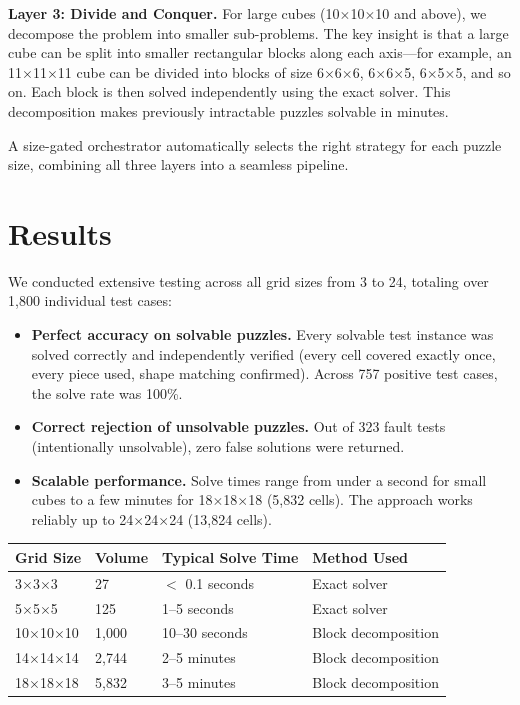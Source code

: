 \documentclass[11pt]{article}
\begin{document}
\textbf{Layer 3: Divide and Conquer.}
For large cubes (10$\times$10$\times$10 and above), we decompose the problem into smaller sub-problems. The key insight is that a large cube can be split into smaller rectangular blocks along each axis---for example, an 11$\times$11$\times$11 cube can be divided into blocks of size 6$\times$6$\times$6, 6$\times$6$\times$5, 6$\times$5$\times$5, and so on. Each block is then solved independently using the exact solver. This decomposition makes previously intractable puzzles solvable in minutes.

A size-gated orchestrator automatically selects the right strategy for each puzzle size, combining all three layers into a seamless pipeline.

\section*{Results}

We conducted extensive testing across all grid sizes from 3 to 24, totaling over 1,800 individual test cases:

\begin{itemize}[nosep]
  \item \textbf{Perfect accuracy on solvable puzzles.} Every solvable test instance was solved correctly and independently verified (every cell covered exactly once, every piece used, shape matching confirmed). Across 757 positive test cases, the solve rate was 100\%.

  \item \textbf{Correct rejection of unsolvable puzzles.} Out of 323 fault tests (intentionally unsolvable), zero false solutions were returned.

  \item \textbf{Scalable performance.} Solve times range from under a second for small cubes to a few minutes for 18$\times$18$\times$18 (5,832 cells). The approach works reliably up to 24$\times$24$\times$24 (13,824 cells).
\end{itemize}

\begin{table}[h]
\centering
\begin{tabular}{@{}llll@{}}
\toprule
\textbf{Grid Size} & \textbf{Volume} & \textbf{Typical Solve Time} & \textbf{Method Used} \\
\midrule
3$\times$3$\times$3 & 27 & $<$ 0.1 seconds & Exact solver \\
5$\times$5$\times$5 & 125 & 1--5 seconds & Exact solver \\
10$\times$10$\times$10 & 1,000 & 10--30 seconds & Block decomposition \\
14$\times$14$\times$14 & 2,744 & 2--5 minutes & Block decomposition \\
18$\times$18$\times$18 & 5,832 & 3--5 minutes & Block decomposition \\
\bottomrule
\end{tabular}
\end{table}
\end{document}
